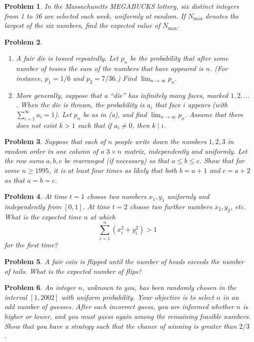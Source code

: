\documentclass[12pt]{article}
\newtheorem{problem}{Problem}
\begin{document}
\begin{problem}
In the Massachusetts MEGABUCKS lottery, six distinct integers from 1 to 36 are selected
each week, uniformly at random. If $N_{\max}$ denotes the largest of the six numbers, find the
expected value of $N_{\max}$.
\end{problem}

\begin{problem}
\begin{enumerate}
\item[(a)] A fair die is tossed repeatedly. Let $p_n$ be the probability that after some number of
tosses the sum of the numbers that have appeared is $n$. (For instance, $p_1 = 1/6$ and
$p_2 = 7/36$.) Find $\lim_{n\to\infty} p_n$.

\item[(b)] More generally, suppose that a “die” has infinitely many faces, marked $1,2,\dots$. When
the die is thrown, the probability is $a_i$ that face $i$ appears (with $\sum_{i=1}^\infty a_i=1$). 
Let $p_n$ be as in (a), and find $\lim_{n\to\infty} p_n$. Assume that there does not exist 
$k>1$ such that if $a_i \neq 0$, then $k \mid i$.
\end{enumerate}
\end{problem}

\begin{problem}
Suppose that each of $n$ people write down the numbers $1,2,3$ in random order in one column
of a $3\times n$ matrix, independently and uniformly. Let the row sums $a,b,c$ be rearranged (if
necessary) so that $a \leq b \leq c$. Show that for some $n \geq 1995$, it is at least four times
as likely that both $b=a+1$ and $c=a+2$ as that $a=b=c$.
\end{problem}

\begin{problem}
At time $t=1$ choose two numbers $x_1,y_1$ uniformly and independently from $[0,1]$. At time
$t=2$ choose two further numbers $x_2,y_2$, etc. What is the expected time $n$ at which
\[
\sum_{i=1}^n (x_i^2 + y_i^2) > 1
\]
for the first time?
\end{problem}

\begin{problem}
A fair coin is flipped until the number of heads exceeds the number of tails. What is the
expected number of flips?
\end{problem}

\begin{problem}
An integer $n$, unknown to you, has been randomly chosen in the interval $[1,2002]$ with uniform
probability. Your objective is to select $n$ in an odd number of guesses. After each incorrect
guess, you are informed whether $n$ is higher or lower, and you must guess again among the
remaining feasible numbers. Show that you have a strategy such that the chance of winning
is greater than $2/3$.
\end{problem}
\end{document}

